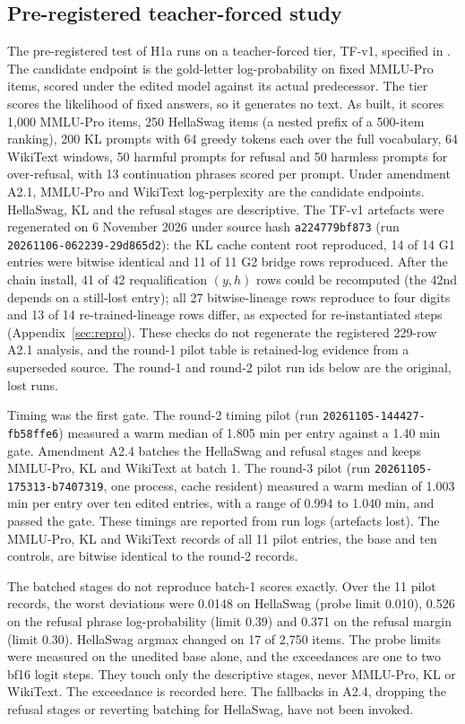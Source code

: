\subsection{Pre-registered teacher-forced study}
\label{sec:tfv1}
\sloppy
The pre-registered test of H1a runs on a teacher-forced tier, TF-v1, specified in . The candidate endpoint is the gold-letter log-probability on fixed MMLU-Pro items, scored under the edited model against its actual predecessor. The tier scores the likelihood of fixed answers, so it generates no text. As built, it scores 1,000 MMLU-Pro items, 250 HellaSwag items (a nested prefix of a 500-item ranking), 200 KL prompts with 64 greedy tokens each over the full vocabulary, 64 WikiText windows, 50 harmful prompts for refusal and 50 harmless prompts for over-refusal, with 13 continuation phrases scored per prompt. Under amendment A2.1, MMLU-Pro and WikiText log-perplexity are the candidate endpoints. HellaSwag, KL and the refusal stages are descriptive. %
The TF-v1 artefacts were regenerated on 6 November 2026 under source hash \texttt{a224779bf873} (run \texttt{20261106-062239-29d865d2}): the KL cache content root reproduced, 14 of 14 G1 entries were bitwise identical and 11 of 11 G2 bridge rows reproduced. After the chain install, 41 of 42 requalification $(y, h)$ rows could be recomputed (the 42nd depends on a still-lost entry); all 27 bitwise-lineage rows reproduce to four digits and 13 of 14 re-trained-lineage rows differ, as expected for re-instantiated steps (Appendix~\ref{sec:repro}). These checks do not regenerate the registered 229-row A2.1 analysis, and the round-1 pilot table is retained-log evidence from a superseded source. The round-1 and round-2 pilot run ids below are the original, lost runs.

Timing was the first gate. The round-2 timing pilot (run \texttt{20261105-144427-fb58ffe6}) measured a warm median of 1.805 min per entry against a 1.40 min gate. Amendment A2.4 batches the HellaSwag and refusal stages and keeps MMLU-Pro, KL and WikiText at batch 1. The round-3 pilot (run \texttt{20261105-175313-b7407319}, one process, cache resident) measured a warm median of 1.003 min per entry over ten edited entries, with a range of 0.994 to 1.040 min, and passed the gate. These timings are reported from run logs (artefacts lost). The MMLU-Pro, KL and WikiText records of all 11 pilot entries, the base and ten controls, are bitwise identical to the round-2 records.

The batched stages do not reproduce batch-1 scores exactly. Over the 11 pilot records, the worst deviations were 0.0148 on HellaSwag (probe limit 0.010), 0.526 on the refusal phrase log-probability (limit 0.39) and 0.371 on the refusal margin (limit 0.30). HellaSwag argmax changed on 17 of 2,750 items. The probe limits were measured on the unedited base alone, and the exceedances are one to two bf16 logit steps. They touch only the descriptive stages, never MMLU-Pro, KL or WikiText. The exceedance is recorded here. The fallbacks in A2.4, dropping the refusal stages or reverting batching for HellaSwag, have not been invoked.

